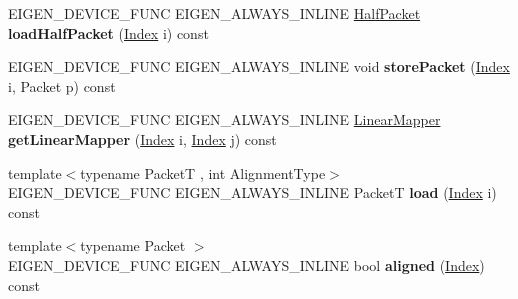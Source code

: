 \begin{DoxyCompactItemize}
\item 
\mbox{\label{class_eigen_1_1internal_1_1_tensor_contraction_sub_mapper_ad7cb69f55cab63f938170648de59bd16}} 
E\+I\+G\+E\+N\+\_\+\+D\+E\+V\+I\+C\+E\+\_\+\+F\+U\+NC E\+I\+G\+E\+N\+\_\+\+A\+L\+W\+A\+Y\+S\+\_\+\+I\+N\+L\+I\+NE \hyperlink{union_eigen_1_1internal_1_1_packet}{Half\+Packet} {\bfseries load\+Half\+Packet} (\hyperlink{namespace_eigen_a62e77e0933482dafde8fe197d9a2cfde}{Index} i) const
\item 
\mbox{\label{class_eigen_1_1internal_1_1_tensor_contraction_sub_mapper_a5f24d2073cb4923764b2dae652d7126b}} 
E\+I\+G\+E\+N\+\_\+\+D\+E\+V\+I\+C\+E\+\_\+\+F\+U\+NC E\+I\+G\+E\+N\+\_\+\+A\+L\+W\+A\+Y\+S\+\_\+\+I\+N\+L\+I\+NE void {\bfseries store\+Packet} (\hyperlink{namespace_eigen_a62e77e0933482dafde8fe197d9a2cfde}{Index} i, Packet p) const
\item 
\mbox{\label{class_eigen_1_1internal_1_1_tensor_contraction_sub_mapper_a7f2ae28bdacf3461dc1a3aee4c2e0518}} 
E\+I\+G\+E\+N\+\_\+\+D\+E\+V\+I\+C\+E\+\_\+\+F\+U\+NC E\+I\+G\+E\+N\+\_\+\+A\+L\+W\+A\+Y\+S\+\_\+\+I\+N\+L\+I\+NE \hyperlink{class_eigen_1_1internal_1_1_tensor_contraction_sub_mapper}{Linear\+Mapper} {\bfseries get\+Linear\+Mapper} (\hyperlink{namespace_eigen_a62e77e0933482dafde8fe197d9a2cfde}{Index} i, \hyperlink{namespace_eigen_a62e77e0933482dafde8fe197d9a2cfde}{Index} j) const
\item 
\mbox{\label{class_eigen_1_1internal_1_1_tensor_contraction_sub_mapper_ac52936ea8eca4faf97db62caae9b38bd}} 
{\footnotesize template$<$typename PacketT , int Alignment\+Type$>$ }\\E\+I\+G\+E\+N\+\_\+\+D\+E\+V\+I\+C\+E\+\_\+\+F\+U\+NC E\+I\+G\+E\+N\+\_\+\+A\+L\+W\+A\+Y\+S\+\_\+\+I\+N\+L\+I\+NE PacketT {\bfseries load} (\hyperlink{namespace_eigen_a62e77e0933482dafde8fe197d9a2cfde}{Index} i) const
\item 
\mbox{\label{class_eigen_1_1internal_1_1_tensor_contraction_sub_mapper_a7aee6b68f435d63d760d8be92fa38baa}} 
{\footnotesize template$<$typename Packet $>$ }\\E\+I\+G\+E\+N\+\_\+\+D\+E\+V\+I\+C\+E\+\_\+\+F\+U\+NC E\+I\+G\+E\+N\+\_\+\+A\+L\+W\+A\+Y\+S\+\_\+\+I\+N\+L\+I\+NE bool {\bfseries aligned} (\hyperlink{namespace_eigen_a62e77e0933482dafde8fe197d9a2cfde}{Index}) const
\end{DoxyCompactItemize}


